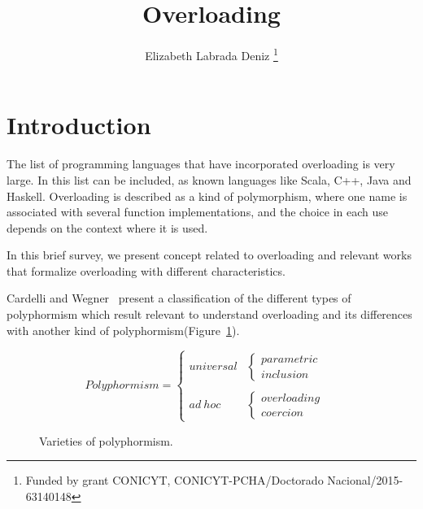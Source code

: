 \documentclass[hidelinks, twocolumn]{article}
\title{\bf Overloading}
\author{Elizabeth Labrada Deniz
\thanks{Funded by grant CONICYT, CONICYT-PCHA/Doctorado Nacional/2015-63140148}}
\affil{Computer Science Department (DCC), University of Chile, Chile}
\date{}
\begin{document}

\setlength{\columnsep}{20pt} %

	\maketitle
	\renewcommand{\abstractname}{Abstract}	
	\begin{abstract}
	\end{abstract}	
\section{Introduction}
The list of programming languages that have incorporated overloading is very large. In this list can be included, as known languages like Scala, C++, Java and Haskell. Overloading is described as a kind of polymorphism, where one name is associated with several function implementations, and the choice in each use depends on the context where it is used.

In this brief survey, we present concept related to overloading and relevant works that formalize overloading with different characteristics.


Cardelli and Wegner~\cite{CardelliWegner} present a classification of the different types of polyphormism which result relevant to understand overloading and its differences with another kind of polyphormism(Figure~\ref{figure:varpolyphormism}).

\begin{figure}[h]
\begin{center}
\[ Polyphormism = 
\begin{cases} 
     universal & 
     \begin{cases} 
     	parametric &\\
     	inclusion &
   	\end{cases} \\
		 & \\
     ad \ hoc & 
     \begin{cases} 
     	overloading & \\
     	coercion &
   	\end{cases}
 \end{cases}
\]
\caption{Varieties of polyphormism.}
\label{figure:varpolyphormism}
\end{center}
\end{figure}
\end{document}
